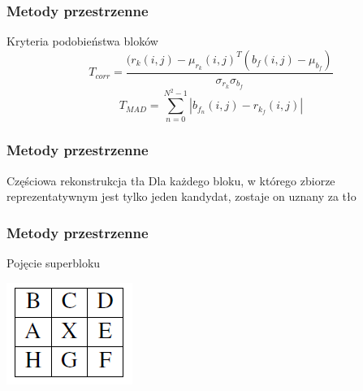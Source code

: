\documentclass{beamer}
\begin{document}
\begin{frame}
\frametitle{Metody przestrzenne}
\begin{block}{Kryteria podobieństwa bloków}
\begin{equation}
\label{Tcorr}
T_{corr}=\frac{{(r_k(i,j)-\mu_{r_k}(i,j)}^T(b_f(i,j)-\mu_{b_f})}{\sigma_{r_k}\sigma_{b_f}}
\end{equation}
\begin{equation}
T_{MAD}=\sum_{n=0}^{N^2-1}\left|b_{f_n}(i,j)-r_{k_f}(i,j)\right|
\end{equation}
\end{block}


\end{frame}
\begin{frame}
\frametitle{Metody przestrzenne}
\begin{block}{Częściowa rekonstrukcja tła}
Dla każdego bloku, w którego zbiorze reprezentatywnym jest tylko jeden kandydat, zostaje on uznany za tło
\end{block}


\end{frame}
\begin{frame}
\frametitle{Metody przestrzenne}
\begin{block}{Pojęcie superbloku}
\begin{center}
\includegraphics{superblok.png}
\end{center}

\end{block}


\end{frame}
\end{document}
